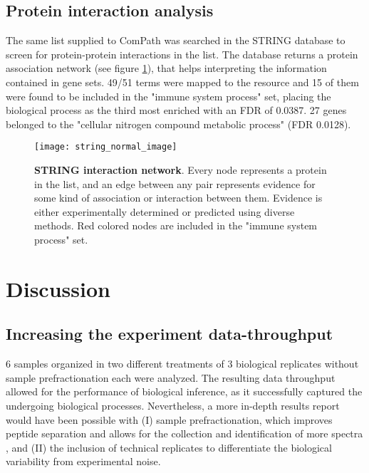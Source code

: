 \subsection{Protein interaction analysis}

The same list supplied to ComPath was searched in the STRING database \cite{Szklarczyk2017} to screen for protein-protein interactions in the list. The database returns a protein association network (see figure \ref{fig:STRING}), that helps interpreting the information contained in gene sets. 49/51 terms were mapped to the resource and 15 of them were found to be included in the "immune system process" set, placing the biological process as the third most enriched with an FDR of 0.0387. 27 genes belonged to the "cellular nitrogen compound metabolic process" (FDR 0.0128).

\begin{figure}[!h]
\centering
\texttt{[image: string\_normal\_image]}
\caption[Protein interaction network]{\textbf{STRING interaction network}. Every node represents a protein in the list, and an edge between any pair represents evidence for some kind of association or interaction between them. Evidence is either experimentally determined or predicted using diverse methods. Red colored nodes are included in the "immune system process" set.}
\label{fig:STRING}
\end{figure}





\section{Discussion}

\subsection{Increasing the experiment data-throughput}

6 samples organized in two different treatments of 3 biological replicates without sample prefractionation each were analyzed. The resulting data throughput allowed for the performance of biological inference, as it successfully captured the undergoing biological processes. Nevertheless, a more in-depth results report would have been possible with (I) sample prefractionation, which improves peptide separation and allows for the collection and identification of more spectra \cite{Righetti2005}, and (II) the inclusion of technical replicates to differentiate the biological variability from experimental noise.

